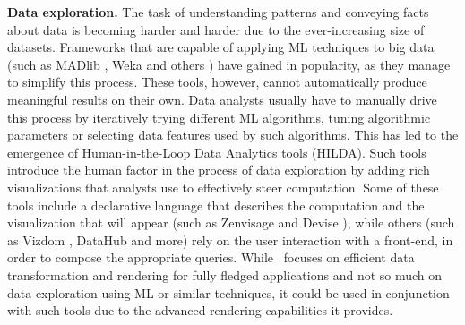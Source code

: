 {\bf Data exploration.} The task of understanding patterns and conveying facts about data is becoming harder and harder due to the ever-increasing size of datasets. Frameworks that are capable of applying ML techniques to big data (such as MADlib \cite{Hellerstein:2012:MAL:2367502.2367510}, Weka \cite{hall2009weka} and others \cite{mahout,mllib}) have gained in popularity, as they manage to simplify this process. These tools, however, cannot automatically produce meaningful results on their own. Data analysts usually have to manually drive this process by iteratively trying different ML algorithms, tuning algorithmic parameters or selecting data features used by such algorithms. This has led to the emergence of Human-in-the-Loop Data Analytics tools (HILDA). Such tools introduce the human factor in the process of data exploration by adding rich visualizations that analysts use to effectively steer computation. Some of these tools include a declarative language that describes the computation and the visualization that will appear (such as Zenvisage \cite{DBLP:journals/corr/SiddiquiKLKP16} and Devise \cite{livny1997devise}), while others (such as Vizdom \cite{crotty2015vizdom}, DataHub \cite{Krishnan:2016:AID:2994509.2994514} and more\cite{derthick1997interactive,  bhardwaj2015collaborative, zoumpatianos2015rinse, DBLP:conf/icde/LiarouI14, Kamat:2016:TSI:2939502.2939514}) rely on the user interaction with a front-end, in order to compose the appropriate queries. While \projname\ focuses on efficient data transformation and rendering for fully fledged applications and not so much on data exploration using ML or similar techniques, it could be used in conjunction with such tools due to the advanced rendering capabilities it provides. 



